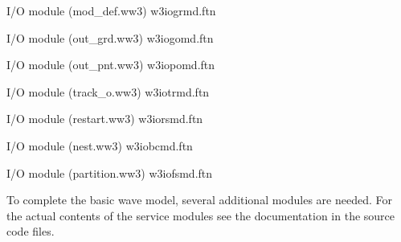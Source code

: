 \vspace{\baselineskip} \noindent
I/O module ({\file mod\_def.ww3}) \hfill {\file w3iogrmd.ftn}

\begin{flisti}
\end{flisti}

\noindent
I/O module ({\file out\_grd.ww3}) \hfill {\file w3iogomd.ftn}

\begin{flisti}
\end{flisti}

\noindent
I/O module ({\file out\_pnt.ww3}) \hfill {\file w3iopomd.ftn}

\begin{flisti}
\end{flisti}

\noindent
I/O module ({\file track\_o.ww3}) \hfill {\file w3iotrmd.ftn}

\begin{flisti}
\end{flisti}

\noindent
I/O module ({\file restart.ww3}) \hfill {\file w3iorsmd.ftn}

\begin{flisti}
\end{flisti}

\noindent
I/O module ({\file nest.ww3}) \hfill {\file w3iobcmd.ftn}

\begin{flisti}
\end{flisti}

\noindent
I/O module ({\file partition.ww3}) \hfill {\file w3iofsmd.ftn}

\begin{flisti}
\end{flisti}

\noindent
To complete the basic wave model, several additional modules are needed. For
the actual contents of the service modules see the documentation in the source
code files.

